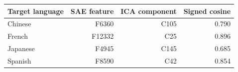 \begin{tabular}{lrrr}
  \toprule
  Target language & SAE feature & ICA component & Signed cosine \\
  \midrule
  Chinese & F6360 & C105 & 0.790 \\
  French & F12332 & C25 & 0.896 \\
  Japanese & F4945 & C145 & 0.685 \\
  Spanish & F8590 & C42 & 0.854 \\
  \bottomrule
\end{tabular}
